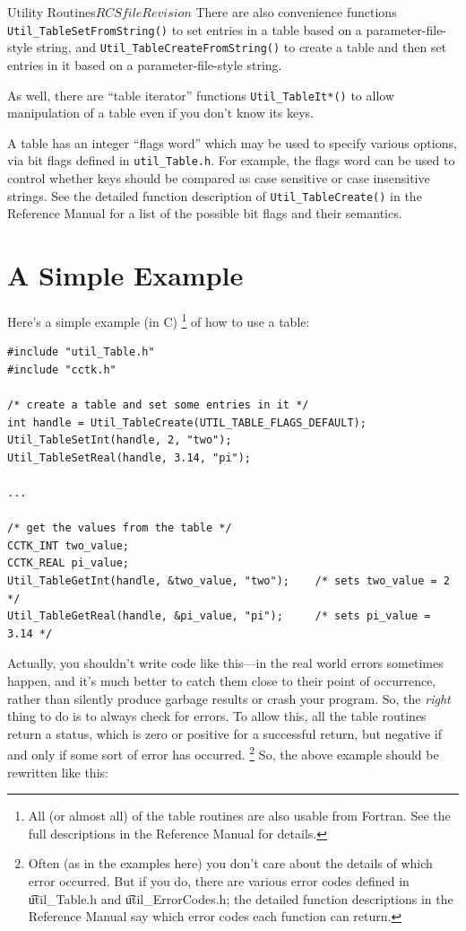 \begin{cactuspart}{Utility Routines}{$RCSfile$}{$Revision$}
There are also convenience functions \verb|Util_TableSetFromString()|
to set entries in a table based on a parameter-file-style string,
and \verb|Util_TableCreateFromString()| to create a table and then
set entries in it based on a parameter-file-style string.

As well, there are ``table iterator'' functions \verb|Util_TableIt*()|
to allow manipulation of a table even if you don't know its keys.

A table has an integer ``flags word'' which may be used to specify
various options, via bit flags defined in \verb|util_Table.h|.
For example, the flags word can be used to control whether keys
should be compared as case sensitive or case insensitive strings.
See the detailed function description of \verb|Util_TableCreate()|
in the Reference Manual for a list
of the possible bit flags and their semantics.


\section{A Simple Example}
\label{Tables_Simple_Example}

Here's a simple example (in C)%
\footnote{%
	 All (or almost all) of the table routines
	 are also usable from Fortran.  See the full
	 descriptions in the Reference Manual
	 for details.
	 }%
{} of how to use a table:
\begin{verbatim}
#include "util_Table.h"
#include "cctk.h"

/* create a table and set some entries in it */
int handle = Util_TableCreate(UTIL_TABLE_FLAGS_DEFAULT);
Util_TableSetInt(handle, 2, "two");
Util_TableSetReal(handle, 3.14, "pi");

...

/* get the values from the table */
CCTK_INT two_value;
CCTK_REAL pi_value;
Util_TableGetInt(handle, &two_value, "two");    /* sets two_value = 2 */
Util_TableGetReal(handle, &pi_value, "pi");     /* sets pi_value = 3.14 */
\end{verbatim}

Actually, you shouldn't write code like this---in the real world
errors sometimes happen, and it's much better to catch them close to
their point of occurrence, rather than silently produce garbage results
or crash your program.  So, the \emph{right} thing to do is to always
check for errors.  To allow this, all the table routines return a status,
which is zero or positive for a successful return, but negative if
and only if some sort of error has occurred.%
\footnote{%
	 Often (as in the examples here) you don't care
	 about the details of which error occurred.  But if
	 you do, there are various error codes defined in
	 {\t util\_Table.h} and {\t util\_ErrorCodes.h};
	 the detailed function descriptions in
	 the Reference Manual
	 say which error codes each function can return.
	 }%
{}  So, the above example should be rewritten like this:


\end{cactuspart}
